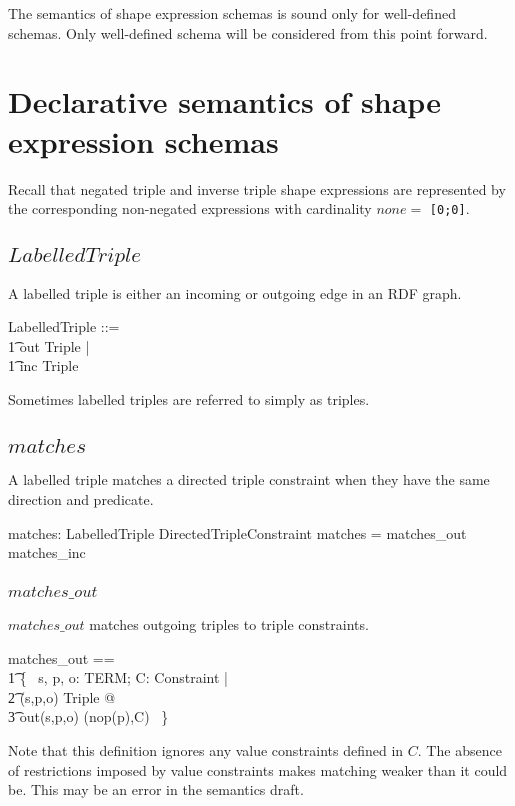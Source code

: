 \documentclass{article}
\begin{document}
The semantics of shape expression schemas is sound only for well-defined schemas.
Only well-defined schema will be considered from this point forward.

\section{Declarative semantics of shape expression schemas}
Recall that negated triple and inverse triple shape expressions are represented by the corresponding non-negated expressions with cardinality
$none =$ {\tt [0;0]}.

\subsection{$LabelledTriple$}
A labelled triple is either an incoming or outgoing edge in an RDF graph.
\begin{zed}
	LabelledTriple ::= \\
\t1		out \ldata Triple \rdata | \\
\t1		inc \ldata Triple \rdata
\end{zed}

Sometimes labelled triples are referred to simply as triples.

\subsection{$matches$}
A labelled triple matches a directed triple constraint when they have the same direction and predicate.
\begin{axdef}
	matches: LabelledTriple \rel DirectedTripleConstraint
\where
	matches = matches\_out \cup matches\_inc
\end{axdef}

\subsubsection{$matches\_out$}
$matches\_out$ matches outgoing triples to triple constraints.
\begin{zed}
	matches\_out == \\
\t1		\{~ s, p, o: TERM; C: Constraint | \\
\t2			(s,p,o) \in Triple @ \\
\t3				out(s,p,o) \mapsto (nop(p),C) ~\}
\end{zed}

Note that this definition ignores any value constraints defined in $C$.
The absence of restrictions imposed by value constraints makes matching weaker than it could be.
This may be an error in the semantics draft.
\end{document}
